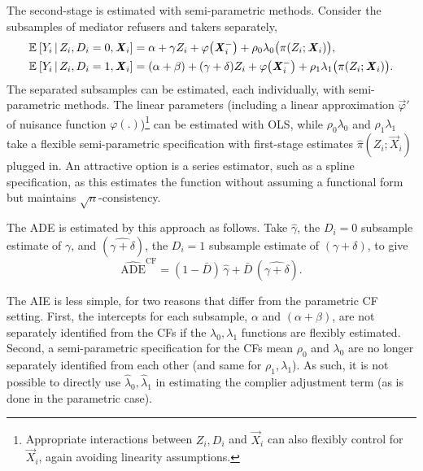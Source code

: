 The second-stage is estimated with semi-parametric methods.
Consider the subsamples of mediator refusers and takers separately,
\begin{align*}
    \mathbb{E}_{} \left[ Y_i \, \middle\vert \, Z_i, D_i = 0, \boldsymbol{\mathit{X}}_i \right] &=
        \alpha + \gamma Z_i + \varphi\big( \boldsymbol{\mathit{X}}_i^- \big)
        + \rho_0 \lambda_0 \big( \pi(Z_i ; \boldsymbol{\mathit{X}}_i) \big), \\
    \mathbb{E}_{} \left[ Y_i \, \middle\vert \, Z_i, D_i = 1, \boldsymbol{\mathit{X}}_i \right] &=
        (\alpha + \beta) + (\gamma + \delta) Z_i + \varphi\big( \boldsymbol{\mathit{X}}_i^- \big)
        + \rho_1 \lambda_1 \big( \pi(Z_i ; \boldsymbol{\mathit{X}}_i) \big).
\end{align*}
The separated subsamples can be estimated, each individually, with semi-parametric methods.
The linear parameters (including a linear approximation $\vec \varphi'$ of nuisance function $\varphi(.)$)\footnote{
    Appropriate interactions between $Z_i, D_i$ and $\vec X_i$ can also flexibly control for $\vec X_i$, again avoiding linearity assumptions.
} can be estimated with OLS, while $\rho_0 \lambda_0$ and $\rho_1 \lambda_1$ take a flexible semi-parametric specification with first-stage estimates $\hat \pi(Z_i; \vec X_i)$ plugged in.
An attractive option is a series estimator, such as a spline specification, as this estimates the function without assuming a functional form but maintains $\sqrt n$-consistency.

The ADE is estimated by this approach as follows.
Take $\hat \gamma$, the $D_i = 0$ subsample estimate of $\gamma$, and $(\hat{\gamma + \delta})$, the $D_i = 1$ subsample estimate of $(\gamma + \delta)$, to give
\[ \hat{\text{ADE}}^{\text{CF}}
    = (1 - \bar D) \, \hat \gamma + \bar D \, (\hat{\gamma + \delta}). \]

The AIE is less simple, for two reasons that differ from the parametric CF setting.
First, the intercepts for each subsample, $\alpha$ and $(\alpha + \beta)$, are not separately identified from the CFs if the $\lambda_0, \lambda_1$ functions are flexibly estimated.
Second, a semi-parametric specification for the CFs mean $\rho_0$ and $\lambda_0$ are no longer separately identified from each other (and same for $\rho_1,\lambda_1$).
As such, it is not possible to directly use $\hat \lambda_0, \hat \lambda_1$ in estimating the complier adjustment term (as is done in the parametric case).

